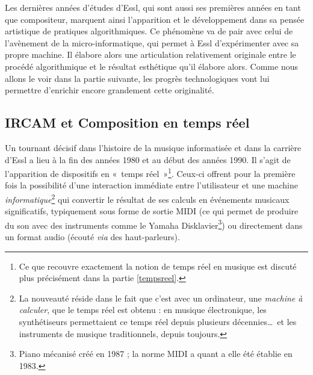 \documentclass[a4paper,12pt]{article}
\newcommand{\guill}[1]{«~#1~»}
\begin{document}
Les dernières années d'études d'Essl, qui sont aussi ses premières années en tant que compositeur, marquent ainsi l'apparition et le développement dans sa pensée artistique de pratiques algorithmiques. Ce phénomène va de pair avec celui de l'avènement de la micro-informatique, qui permet à Essl d'expérimenter avec sa propre machine. Il élabore alors une articulation relativement originale entre le procédé algorithmique et le résultat esthétique qu'il élabore alors. Comme nous allons le voir dans la partie suivante, les progrès technologiques vont lui permettre d'enrichir encore grandement cette originalité.

\subsection{IRCAM et Composition en temps réel}
\label{ircam}

Un tournant décisif dans l'histoire de la musique informatisée et dans la carrière d'Essl a lieu à la fin des années 1980 et au début des années 1990. Il s'agit de l'apparition de dispositifs en \guill{temps réel}\footnote{Ce que recouvre exactement la notion de temps réel en musique est discuté plus précisément dans la partie \ref{tempsreel}.}. Ceux-ci offrent pour la première fois la possibilité d'une interaction immédiate entre l'utilisateur et une machine \emph{informatique}\footnote{La nouveauté réside dans le fait que c'est avec un ordinateur, une \emph{machine à calculer}, que le temps réel est obtenu : en musique électronique, les synthétiseurs permettaient ce temps réel depuis plusieurs décennies\dots~et les instruments de musique traditionnels, depuis toujours.} qui convertir le résultat de ses calculs en événements musicaux significatifs, typiquement sous forme de sortie MIDI (ce qui permet de produire du son avec des instruments comme le Yamaha Disklavier\footnote{Piano mécanisé créé en 1987 ; la norme MIDI a quant a elle été établie en 1983.}) ou directement dans un format audio (écouté \emph{via} des haut-parleurs).
\end{document}
